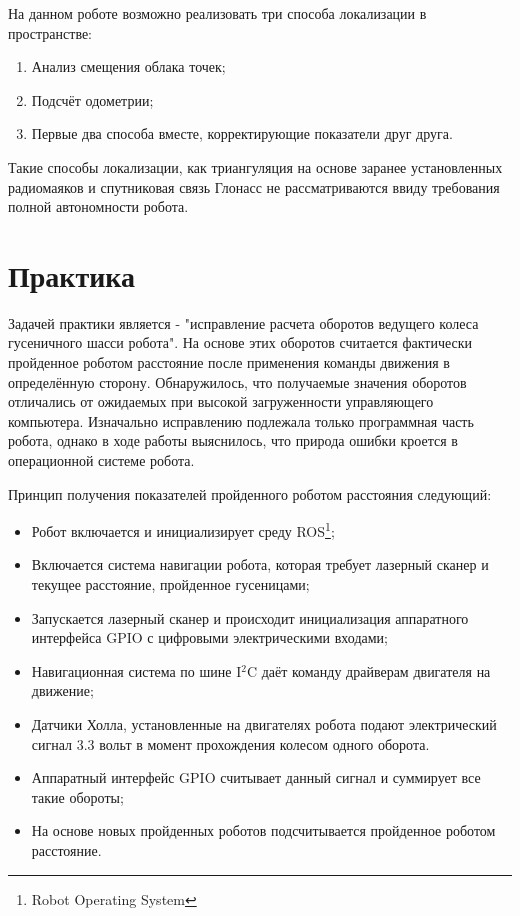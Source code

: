 \documentclass[12pt,a4paper]{scrartcl}
\begin{document}
			На данном роботе возможно реализовать три способа локализации в пространстве:
			\begin{enumerate}
				\item Анализ смещения облака точек;
				\item Подсчёт одометрии;
				\item Первые два способа вместе, корректирующие показатели друг друга.
			\end{enumerate}
			
			Такие способы локализации, как триангуляция на основе заранее установленных радиомаяков и спутниковая связь Глонасс не рассматриваются ввиду требования полной автономности робота.
			
		\section*{Практика}
			Задачей практики является - "исправление расчета оборотов ведущего колеса гусеничного шасси робота". На основе этих оборотов считается фактически пройденное роботом расстояние после применения команды движения в определённую сторону. Обнаружилось, что получаемые значения оборотов отличались от ожидаемых при высокой загруженности управляющего компьютера. Изначально исправлению подлежала только программная часть робота, однако в ходе работы выяснилось, что природа ошибки кроется в операционной системе робота. 
			
			Принцип получения показателей пройденного роботом расстояния следующий:
			\begin{itemize}
				\item Робот включается и инициализирует среду ROS\footnote{Robot Operating System};
				\item Включается система навигации робота, которая требует лазерный сканер и текущее расстояние, пройденное гусеницами;
				\item Запускается лазерный сканер и происходит инициализация аппаратного интерфейса GPIO с цифровыми электрическими входами;
				\item Навигационная система по шине I$^2$C даёт команду драйверам двигателя на движение;
				\item Датчики Холла, установленные на двигателях робота подают электрический сигнал 3.3 вольт в момент прохождения колесом одного оборота.
				\item Аппаратный интерфейс GPIO считывает данный сигнал и суммирует все такие обороты;
				\item На основе новых пройденных роботов подсчитывается пройденное роботом расстояние.
			\end{itemize}
			
\end{document}
